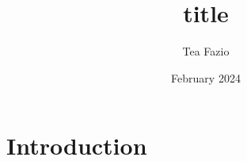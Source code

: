 \documentclass{article}
\title{title}
\author{Tea Fazio}
\date{February 2024}
\begin{document}
\maketitle

\section{Introduction}
\end{document}
